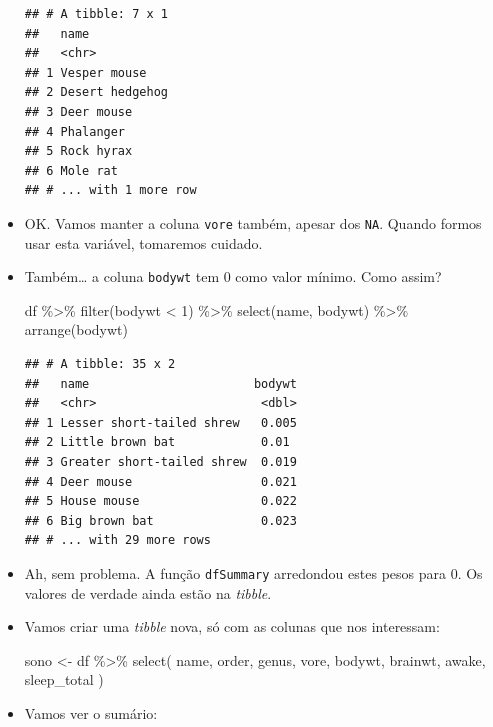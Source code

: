 \documentclass[
  11pt]{report}
\newenvironment{Shaded}{\begin{snugshade}}{\end{snugshade}}
\newcommand{\DecValTok}[1]{\textcolor[rgb]{0.00,0.00,0.81}{#1}}
\newcommand{\FunctionTok}[1]{\textcolor[rgb]{0.00,0.00,0.00}{#1}}
\newcommand{\NormalTok}[1]{#1}
\newcommand{\OtherTok}[1]{\textcolor[rgb]{0.56,0.35,0.01}{#1}}
\newcommand{\SpecialCharTok}[1]{\textcolor[rgb]{0.00,0.00,0.00}{#1}}
\renewenvironment{Shaded}{
    \begin{mdframed}[%
      roundcorner=2pt,%
      innerleftmargin=5pt,%
      innerrightmargin=5pt,%
      topline=true,%
      leftline=true,%
      rightline=true,%
      bottomline=true,%
      linewidth=0.5pt,%
      linecolor=black!20,%
      backgroundcolor=black!2,%
      skipabove=2ex,%
      skipbelow=2.5ex%
    ]%
  }
  {
    \end{mdframed}
  }
\begin{document}
\begin{itemize}
\begin{verbatim}
## # A tibble: 7 x 1
##   name           
##   <chr>          
## 1 Vesper mouse   
## 2 Desert hedgehog
## 3 Deer mouse     
## 4 Phalanger      
## 5 Rock hyrax     
## 6 Mole rat       
## # ... with 1 more row
\end{verbatim}
\item
  OK. Vamos manter a coluna \texttt{vore} também, apesar dos \texttt{NA}. Quando formos usar esta variável, tomaremos cuidado.
\item
  Também\ldots{} a coluna \texttt{bodywt} tem 0 como valor mínimo. Como assim?

\begin{Shaded}
\begin{Highlighting}[]
\NormalTok{df }\SpecialCharTok{\%\textgreater{}\%} 
  \FunctionTok{filter}\NormalTok{(bodywt }\SpecialCharTok{\textless{}} \DecValTok{1}\NormalTok{) }\SpecialCharTok{\%\textgreater{}\%} 
  \FunctionTok{select}\NormalTok{(name, bodywt) }\SpecialCharTok{\%\textgreater{}\%} 
  \FunctionTok{arrange}\NormalTok{(bodywt)}
\end{Highlighting}
\end{Shaded}

\begin{verbatim}
## # A tibble: 35 x 2
##   name                       bodywt
##   <chr>                       <dbl>
## 1 Lesser short-tailed shrew   0.005
## 2 Little brown bat            0.01 
## 3 Greater short-tailed shrew  0.019
## 4 Deer mouse                  0.021
## 5 House mouse                 0.022
## 6 Big brown bat               0.023
## # ... with 29 more rows
\end{verbatim}
\item
  Ah, sem problema. A função \texttt{dfSummary} arredondou estes pesos para 0. Os valores de verdade ainda estão na \emph{tibble}.
\item
  Vamos criar uma \emph{tibble} nova, só com as colunas que nos interessam:

\begin{Shaded}
\begin{Highlighting}[]
\NormalTok{sono }\OtherTok{\textless{}{-}}\NormalTok{ df }\SpecialCharTok{\%\textgreater{}\%} 
  \FunctionTok{select}\NormalTok{(}
\NormalTok{    name, order, genus, vore, bodywt, }
\NormalTok{    brainwt, awake, sleep\_total}
\NormalTok{  )}
\end{Highlighting}
\end{Shaded}
\item
  Vamos ver o sumário:


\end{itemize}
\end{document}
